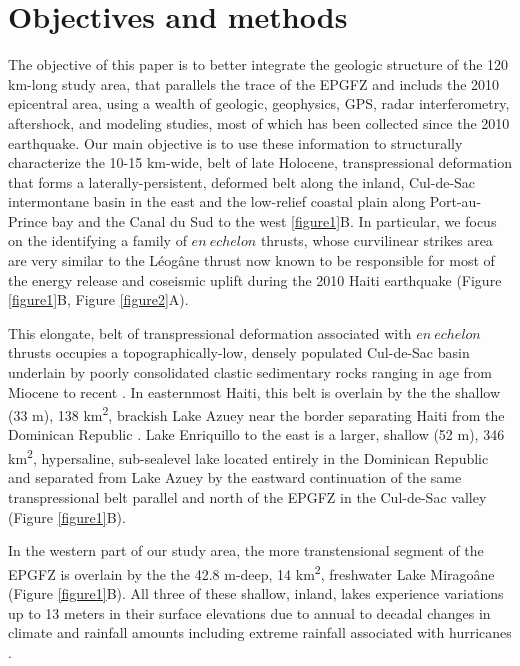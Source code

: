 \documentclass[linenumbers,draft]{agujournal}
\begin{document}
\section{Objectives and methods}
The objective of this paper is to better integrate the geologic structure of the 120 km-long study area, that parallels the trace of the EPGFZ and includs the 2010 epicentral area, using a wealth of geologic, geophysics, GPS, radar interferometry, aftershock, and modeling studies, most of which has been collected since the 2010 earthquake. Our main objective is to use these information to structurally characterize the 10-15 km-wide, belt of late Holocene, transpressional deformation that forms a laterally-persistent, deformed belt along the inland, Cul-de-Sac intermontane basin in the east and the low-relief coastal plain along Port-au-Prince bay and the Canal du Sud to the west \ref{figure1}B. In particular, we focus on the identifying a family of $en~echelon$ thrusts, whose curvilinear strikes area are very similar to the L\'eog\^ane thrust now known to be responsible for most of the energy release and coseismic uplift during the 2010 Haiti earthquake \citep{calais2010transpressional,douilly2013crustal,douilly2015three} (Figure \ref{figure1}B, Figure \ref{figure2}A).

This elongate, belt of transpressional deformation associated with $en~echelon$ thrusts occupies a topographically-low, densely populated Cul-de-Sac basin underlain by poorly consolidated clastic sedimentary rocks ranging in age from Miocene to recent \citep{massoni1955haiti,mann1995actively,terrier2014revision,saint2015seismotectonics}. In easternmost Haiti, this belt is overlain by the the shallow (33 m), 138 km\textsuperscript{2}, brackish Lake Azuey near the border separating Haiti from the Dominican Republic \citep{wright2015factors,piasecki2016bathymetric}. Lake Enriquillo to the east is a larger, shallow (52 m), 346 km\textsuperscript{2}, hypersaline, sub-sealevel lake located entirely in the Dominican Republic and separated from Lake Azuey by the eastward continuation of the same transpressional belt parallel and north of the EPGFZ in the Cul-de-Sac valley \citep{mann1995actively} (Figure \ref{figure1}B). 

In the western part of our study area, the more transtensional segment of the EPGFZ is overlain by the the 42.8 m-deep, 14 km\textsuperscript{2}, freshwater Lake Mirago\^ane (Figure \ref{figure1}B). All three of these shallow, inland, lakes experience variations up to 13 meters in their surface elevations due to annual to decadal changes in climate and rainfall amounts including extreme rainfall associated with hurricanes \citep{wright2015factors,piasecki2016bathymetric,moknatian2017development,rico2017hydrodynamic}.  
  
\end{document}
